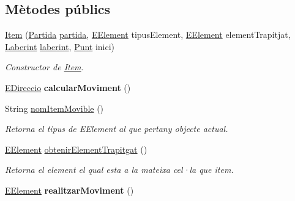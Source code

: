 \subsection*{Mètodes públics}
\begin{DoxyCompactItemize}
\item 
\hyperlink{classlogica_1_1_item_ac19a70f15ff1f377848f1df34a6e1137}{Item} (\hyperlink{classlogica_1_1_partida}{Partida} \hyperlink{classlogica_1_1_item_movible_ace55b4918a7f671f89ed3109c91359e4}{partida}, \hyperlink{enumlogica_1_1enumeracions_1_1_e_element}{E\+Element} tipus\+Element, \hyperlink{enumlogica_1_1enumeracions_1_1_e_element}{E\+Element} element\+Trapitjat, \hyperlink{classlogica_1_1laberints_1_1_laberint}{Laberint} \hyperlink{classlogica_1_1_item_movible_a97036130b7376d77776427ca126f6fb5}{laberint}, \hyperlink{classlogica_1_1_punt}{Punt} inici)
\begin{DoxyCompactList}\small\item\em Constructor de \hyperlink{classlogica_1_1_item}{Item}. \end{DoxyCompactList}\item 
\hypertarget{classlogica_1_1_item_a0b85057e526c921f66a586e334b94685}{\hyperlink{enumlogica_1_1enumeracions_1_1_e_direccio}{E\+Direccio} {\bfseries calcular\+Moviment} ()}\label{classlogica_1_1_item_a0b85057e526c921f66a586e334b94685}

\item 
\hypertarget{classlogica_1_1_item_a729ac980199af2b84c3dc6ef14b57e43}{String \hyperlink{classlogica_1_1_item_a729ac980199af2b84c3dc6ef14b57e43}{nom\+Item\+Movible} ()}\label{classlogica_1_1_item_a729ac980199af2b84c3dc6ef14b57e43}

\begin{DoxyCompactList}\small\item\em Retorna el tipus de E\+Element al que pertany objecte actual. \end{DoxyCompactList}\item 
\hyperlink{enumlogica_1_1enumeracions_1_1_e_element}{E\+Element} \hyperlink{classlogica_1_1_item_a81cb8508f21f320f54ca5d279fa24625}{obtenir\+Element\+Trapitgat} ()
\begin{DoxyCompactList}\small\item\em Retorna el element el qual esta a la mateixa cel·la que item. \end{DoxyCompactList}\item 
\hypertarget{classlogica_1_1_item_a9990d70a8ad35319d2bb9d10b294b17a}{\hyperlink{enumlogica_1_1enumeracions_1_1_e_element}{E\+Element} {\bfseries realitzar\+Moviment} ()}\label{classlogica_1_1_item_a9990d70a8ad35319d2bb9d10b294b17a}

\end{DoxyCompactItemize}
